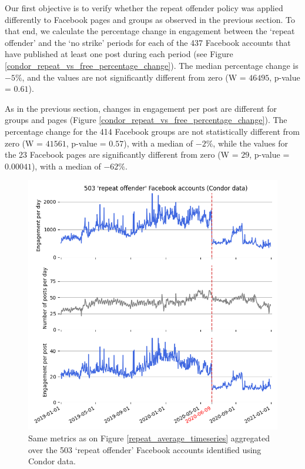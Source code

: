 \documentclass[review]{elsarticle}
\begin{document}
Our first objective is to verify whether the repeat offender policy was applied differently to Facebook pages and groups as observed in the previous section.
To that end, we calculate the percentage change in engagement between the `repeat offender' and the `no strike' periods for each of the 437 Facebook accounts that have published at least one post during each period (see Figure \ref{condor_repeat_vs_free_percentage_change}). 
The median percentage change is $-5\%$, and the values are not significantly different from zero (W = $46495$, p-value = $0.61$).

As in the previous section, changes in engagement per post are different for groups and pages (Figure \ref{condor_repeat_vs_free_percentage_change}).
The percentage change for the 414 Facebook groups are not statistically different from zero (W = $41561$, p-value = $0.57$), with a median of $-2\%$, while the values for the 23 Facebook pages are significantly different from zero (W = $29$, p-value = $0.00041$), with a median of $-62\%$.

\begin{figure}[!h]
\centering
\includegraphics[scale=0.5]{./../figure/condor_average_timeseries.png}
\caption{
Same metrics as on Figure \ref{repeat_average_timeseries} aggregated over the 503 `repeat offender' Facebook accounts identified using Condor data.
}
\label{condor_average_timeseries}
\end{figure}
\end{document}
